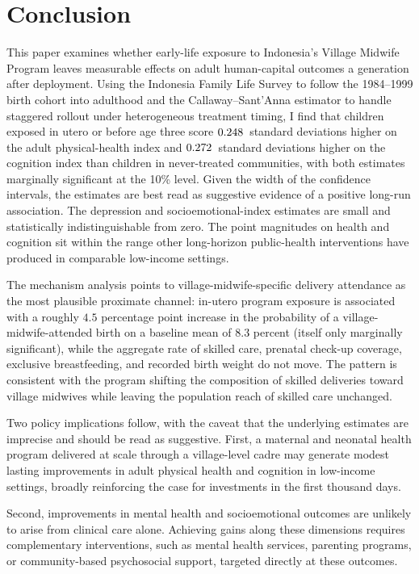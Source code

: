 
\section{Conclusion} \label{sec:conclusion}

This paper examines whether early-life exposure to Indonesia's Village Midwife Program leaves measurable effects on adult human-capital outcomes a generation after deployment. Using the Indonesia Family Life Survey to follow the 1984--1999 birth cohort into adulthood and the Callaway--Sant'Anna estimator to handle staggered rollout under heterogeneous treatment timing, I find that children exposed in utero or before age three score $0.248$~standard deviations higher on the adult physical-health index and $0.272$~standard deviations higher on the cognition index than children in never-treated communities, with both estimates marginally significant at the 10\% level. Given the width of the confidence intervals, the estimates are best read as suggestive evidence of a positive long-run association. The depression and socioemotional-index estimates are small and statistically indistinguishable from zero. The point magnitudes on health and cognition sit within the range other long-horizon public-health interventions have produced in comparable low-income settings.

The mechanism analysis points to village-midwife-specific delivery attendance as the most plausible proximate channel: in-utero program exposure is associated with a roughly $4.5$ percentage point increase in the probability of a village-midwife-attended birth on a baseline mean of $8.3$ percent (itself only marginally significant), while the aggregate rate of skilled care, prenatal check-up coverage, exclusive breastfeeding, and recorded birth weight do not move. The pattern is consistent with the program shifting the composition of skilled deliveries toward village midwives while leaving the population reach of skilled care unchanged.

Two policy implications follow, with the caveat that the underlying estimates are imprecise and should be read as suggestive. First, a maternal and neonatal health program delivered at scale through a village-level cadre may generate modest lasting improvements in adult physical health and cognition in low-income settings, broadly reinforcing the case for investments in the first thousand days.

Second, improvements in mental health and socioemotional outcomes are unlikely to arise from clinical care alone. Achieving gains along these dimensions requires complementary interventions, such as mental health services, parenting programs, or community-based psychosocial support, targeted directly at these outcomes.
